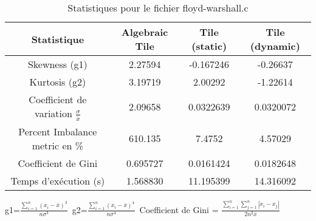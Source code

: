 \documentclass{article}
\begin{document}
\begin{table}[htbp]
  \centering
  \caption{Statistiques pour le fichier floyd-warshall.c}
  \begin{tabular}{|c|c|c|c|}
    \hline
    Statistique & Algebraic Tile & Tile (static) & Tile (dynamic) \\ 
    \hline
    Skewness (g1)  & 2.27594 & -0.167246 & -0.26637 \\ 
    Kurtosis (g2)  & 3.19719 & 2.00292 & -1.22614 \\ 
    Coefficient de variation $ \frac{\sigma}{\overline{x}} $ & 2.09658 & 0.0322639 & 0.0320072\\ 
    Percent Imbalance metric en \% & 610.135 & 7.4752 & 4.57029\\ 
    Coefficient de Gini  & 0.695727 & 0.0161424 & 0.0182648\\ 
    Temps d'exécution (s) &  1.568830    &  11.195399   &  14.316092   \\ 

    \hline
  \end{tabular}
\end{table}
g1=$ \frac{\sum_{i=1}^{n} (x_i - \overline{x})^3}{n\sigma^3} $\
g2=$ \frac{\sum_{i=1}^{n} (x_i - \overline{x})^4}{n\sigma^4} $\
Coefficient de Gini = $ \frac{\sum_{i=1}^{n}\sum_{j=1}^{n} |x_i - x_j|}{2n^2\overline{x}} $\
\newpage
\end{document}
